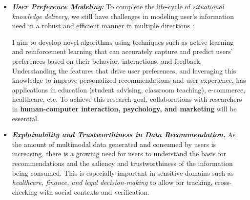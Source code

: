 \begin{itemize}[leftmargin=0pt, topsep=0pt,itemsep=0em]
    \item \textbf{\textit{User Preference Modeling:}}
To complete the life-cycle of \textit{situational knowledge delivery}, we still have challenges in modeling user's information need in a robust and efficient manner in multiple directions \cite{solaiman2021applying}:
I aim to develop novel algorithms using techniques such as active learning and reinforcement learning that can accurately capture and predict users' preferences based on their behavior, interactions, and feedback.
Understanding the features that drive user preferences, and leveraging this knowledge to improve personalized recommendations and user experience, has applications in education (student advising, classroom teaching), e-commerce, healthcare, etc.
%
%
To achieve this research goal, collaborations with researchers in \textbf{ human-computer interaction, psychology, and marketing} will be essential. 
\item \textbf{\textit{Explainability and Trustworthiness in Data Recommendation.}}
As the amount of multimodal data generated and consumed by users is increasing, there is a growing need for users to understand the basis for recommendations \cite{solaiman2022femmir}
and the saliency and trustworthiness of the information being consumed. This is especially important in sensitive domains such as \textit{healthcare, finance, and legal decision-making} to allow for tracking, cross-checking with social contexts and verification.

\end{itemize}
